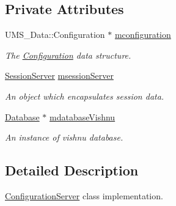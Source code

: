 \subsection*{Private Attributes}
\begin{DoxyCompactItemize}
\item 
\hypertarget{classConfigurationServer_aca605c70418f29ec829030ed12406368}{
UMS\_\-Data::Configuration $\ast$ \hyperlink{classConfigurationServer_aca605c70418f29ec829030ed12406368}{mconfiguration}}
\label{classConfigurationServer_aca605c70418f29ec829030ed12406368}

\begin{DoxyCompactList}\small\item\em The \hyperlink{classConfiguration}{Configuration} data structure. \item\end{DoxyCompactList}\item 
\hypertarget{classConfigurationServer_a6248d4b95b441e19a1d31ae881b2d368}{
\hyperlink{classSessionServer}{SessionServer} \hyperlink{classConfigurationServer_a6248d4b95b441e19a1d31ae881b2d368}{msessionServer}}
\label{classConfigurationServer_a6248d4b95b441e19a1d31ae881b2d368}

\begin{DoxyCompactList}\small\item\em An object which encapsulates session data. \item\end{DoxyCompactList}\item 
\hypertarget{classConfigurationServer_a8b49b5c9d7ce0a2d50bd51995bdbadd4}{
\hyperlink{classDatabase}{Database} $\ast$ \hyperlink{classConfigurationServer_a8b49b5c9d7ce0a2d50bd51995bdbadd4}{mdatabaseVishnu}}
\label{classConfigurationServer_a8b49b5c9d7ce0a2d50bd51995bdbadd4}

\begin{DoxyCompactList}\small\item\em An instance of vishnu database. \item\end{DoxyCompactList}\end{DoxyCompactItemize}


\subsection{Detailed Description}
\hyperlink{classConfigurationServer}{ConfigurationServer} class implementation. 

